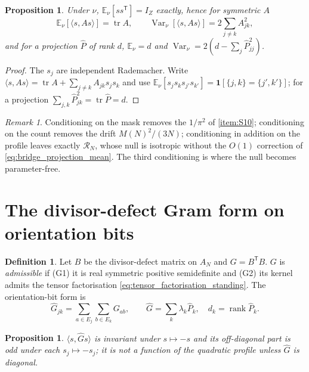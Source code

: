 \documentclass[11pt]{amsart}
\numberwithin{equation}{section}
\theoremstyle{plain}
\newtheorem{proposition}[theorem]{Proposition}
\theoremstyle{definition}
\newtheorem{definition}[theorem]{Definition}
\theoremstyle{remark}
\newtheorem{remark}[theorem]{Remark}
\DeclareMathOperator{\tr}{tr}
\DeclareMathOperator{\rank}{rank}
\DeclareMathOperator{\Var}{Var}
\begin{document}
\begin{proposition}
\label{prop:exact_isotropy}
Under $\nu$, $\mathbb E_\nu[ss^{\mathsf T}]=I_Z$ exactly, hence for
symmetric $A$
\begin{equation}
\mathbb E_\nu[\langle s,As\rangle]=\tr A,
\qquad
\Var_\nu[\langle s,As\rangle]=2\sum_{j\ne k}A_{jk}^2,
\label{eq:exact_mean_variance}
\end{equation}
and for a projection $\widehat P$ of rank $d$,
$\mathbb E_\nu=d$ and
$\Var_\nu=2(d-\sum_j\widehat P_{jj}^2)$.
\end{proposition}

\begin{proof}
The $s_j$ are independent Rademacher. Write
$\langle s,As\rangle=\tr A+\sum_{j\ne k}A_{jk}s_js_k$ and use
$\mathbb E_\nu[s_js_ks_{j'}s_{k'}]=\mathbf 1[\{j,k\}=\{j',k'\}]$;
for a projection $\sum_{j,k}\widehat P_{jk}^2=\tr\widehat P=d$.
\end{proof}

\begin{remark}
\label{rem:hierarchy_of_nulls}
Conditioning on the mask removes the $1/\pi^2$ of \ref{item:S10};
conditioning on the count removes the drift $M(N)^2/(3N)$; conditioning
in addition on the profile leaves exactly $\mathcal R_N$, whose null is
isotropic without the $O(1)$ correction of
\eqref{eq:bridge_projection_mean}. The third conditioning is where the
null becomes parameter-free.
\end{remark}

\section{The divisor-defect Gram form on orientation bits}
\label{sec:gram_form}

\begin{definition}
\label{def:hypotheses_on_G}
Let $B$ be the divisor-defect matrix on $A_N$ and $G=B^{\mathsf T}B$.
$G$ is \emph{admissible} if (G1) it is real symmetric positive
semidefinite and (G2) its kernel admits the tensor factorisation
\eqref{eq:tensor_factorisation_standing}. The orientation-bit form is
\begin{equation}
\widehat G_{jk}=\sum_{a\in E_j}\sum_{b\in E_k}G_{ab},
\qquad
\widehat G=\sum_k\lambda_k\widehat P_k,\quad d_k=\rank\widehat P_k .
\label{eq:pushed_form}
\end{equation}
\end{definition}

\begin{proposition}
\label{prop:pushed_form_odd}
$\langle s,\widehat Gs\rangle$ is invariant under $s\mapsto-s$ and its
off-diagonal part is odd under each $s_j\mapsto-s_j$; it is not a
function of the quadratic profile unless $\widehat G$ is diagonal.
\end{proposition}
\end{document}
